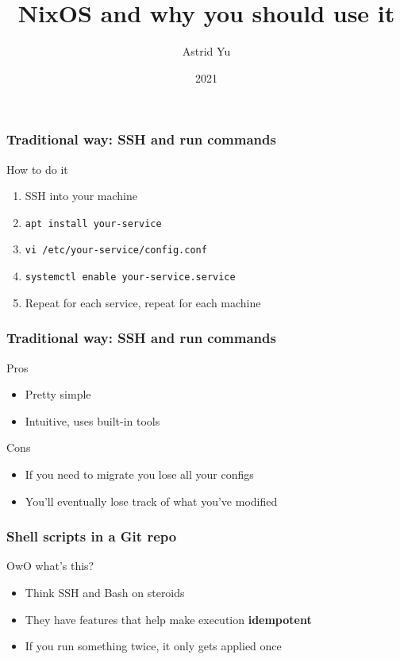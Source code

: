\documentclass{beamer}
\title{NixOS and why you should use it}
\author{Astrid Yu}
\institute{Cal Poly Linux Users Group}
\date{2021}
\begin{document}
\frame{\titlepage}

\begin{frame}
    \frametitle{Traditional way: SSH and run commands}

    \begin{block}{How to do it}
        \begin{enumerate}
            \item SSH into your machine
            \item \texttt{apt install your-service}
            \item \texttt{vi /etc/your-service/config.conf}
            \item \texttt{systemctl enable your-service.service}
            \item Repeat for each service, repeat for each machine
        \end{enumerate}
    \end{block}
\end{frame}

\begin{frame}
    \frametitle{Traditional way: SSH and run commands}

    \begin{alertblock}{Pros}
        \begin{itemize}
            \item Pretty simple
            \item Intuitive, uses built-in tools
        \end{itemize}
    \end{alertblock}

    \pause

    \begin{alertblock}{Cons}
        \begin{itemize}
            \item If you need to migrate you lose all your configs
            \item You'll eventually lose track of what you've modified
        \end{itemize}
    \end{alertblock}
\end{frame}

\begin{frame}
    \frametitle{Shell scripts in a Git repo}
    
    \begin{block}{OwO what's this?}
        \begin{itemize}
            \item Think SSH and Bash on steroids
            \item They have features that help make execution \textbf{idempotent}
            \item If you run something twice, it only gets applied once
        \end{itemize}
    \end{block}
\end{frame}
\end{document}
